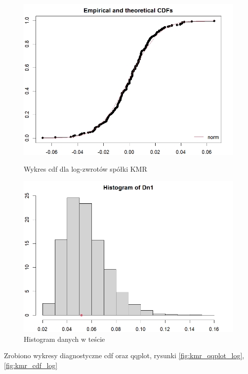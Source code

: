 \documentclass[a4paper,11pt]{article}
\begin{document}
\begin{figure}[!htb]
    \begin{minipage}{0.45\textwidth}
        \centering
        \includegraphics[width=\linewidth]{kmr_cdf_log.png}
        \caption{Wykres cdf dla log-zwrotów spółki KMR}
        \label{fig:kmr_cdf_log}
    \end{minipage}\hspace{0.05\textwidth}%
    \begin{minipage}{0.45\textwidth}
        \centering
        \includegraphics[width=\linewidth]{kmr_histMC.png}
        \caption{Histogram danych w teście}
        \label{fig:kmr_histMC}
    \end{minipage}
\end{figure}

Zrobiono wykresy diagnostyczne cdf oraz qqplot, rysunki \ref{fig:kmr_qqplot_log}, \ref{fig:kmr_cdf_log}
\end{document}
